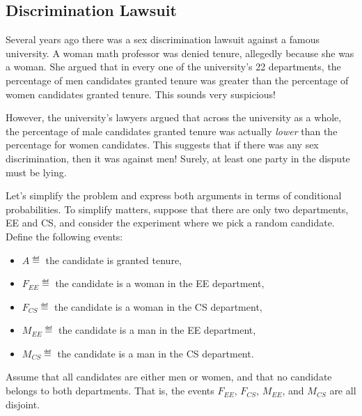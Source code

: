 \iffalse

A counterexample is shown in Figure~\ref{fig:15D2}.  In this case,
$\prcond{A}{B} = 1/2$, $\prcond{A}{C} = 1/2$, $\prcond{A}{B \intersect
  C} = 1$, and $\prcond{A}{B \union C} = 1/3$.  However, since
$1/3 \ne 1/2 + 1/2 - 1$, equation~\eqref{LN12:fc} does not hold.
%
\begin{figure}

\graphic{cx19}

\caption{A counterexample to equation~\eqref{LN12:fc}.  Event~$A$ is
  the dark-bordered rectangle, event~$B$ is the rectangle with
  vertical stripes, and event~$C$ is the rectangle with horizontal
  stripes.  $B \intersect C$ lies entirely within~$A$ while $B - C$
  and $C - B$ are entirely outside of~$A$.}

\label{fig:15D2}

\end{figure}
\fi


\subsection{Discrimination Lawsuit}\label{discrimination_subsec}

Several years ago there was a sex discrimination lawsuit against a
famous university.  A woman math professor was denied tenure,
allegedly because she was a woman.  She argued that in every one of
the university's 22 departments, the percentage of men candidates
granted tenure was greater than the percentage of women candidates
granted tenure.  This sounds very suspicious!

However, the university's lawyers argued that across the university as
a whole, the percentage of male candidates granted tenure was actually
\emph{lower} than the percentage for women candidates.  This suggests
that if there was any sex discrimination, then it was against men!
Surely, at least one party in the dispute must be lying.

Let's simplify the problem and express both arguments in terms of
conditional probabilities.  To simplify matters, suppose that there
are only two departments, EE and CS, and consider the experiment where
we pick a random candidate.  Define the following events:
%
\begin{itemize}
\item $A \eqdef$ the candidate is granted tenure,
\item $F_{EE} \eqdef$ the candidate is a woman in the EE department,
\item $F_{CS} \eqdef$ the candidate is a woman in the CS department,
\item $M_{EE} \eqdef$ the candidate is a man in the EE department,
\item $M_{CS} \eqdef$ the candidate is a man in the CS department.
\end{itemize}
Assume that all candidates are either men or women, and that no
candidate belongs to both departments.  That is, the events $F_{EE}$,
$F_{CS}$, $M_{EE}$, and $M_{CS}$ are all disjoint.

